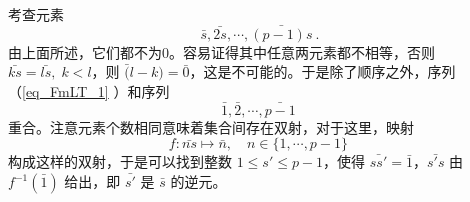 考查元素 
\begin{equation}\label{eq_FmLT_1}
\bar s,\bar{2s},\cdots,\bar{(p-1)s}~.
\end{equation}
由上面所述，它们都不为0。容易证得其中任意两元素都不相等，否则 $\bar {ks}=\bar{ls},\;k<l$，则 $\bar(l-k)=\bar 0$，这是不可能的。于是除了顺序之外，序列（\autoref{eq_FmLT_1} ）和序列
\begin{equation}
\bar 1,\bar 2,\cdots,\bar{p-1}~
\end{equation}
重合。注意元素个数相同意味着集合间存在双射，对于这里，映射
\begin{equation}
f:\bar{ns}\mapsto \bar n,\quad n\in\{1,\cdots,p-1\}~
\end{equation}
构成这样的双射，于是可以找到整数 $1\leq s'\leq p-1$，使得 $\bar{ss'}=\bar 1$，$\bar{s's}$ 由 $f^{-1}(\bar 1)$ 给出，即 $\bar{s'}$ 是 $\bar s$ 的逆元。
